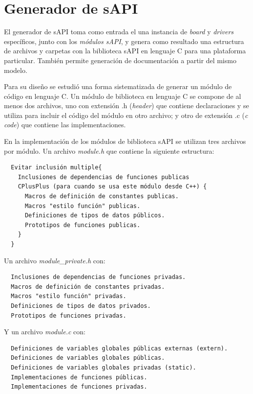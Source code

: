 \section{Generador de sAPI}
\label{sec:modelGenerator}

El generador de sAPI toma como entrada el una instancia de \emph{board} y \emph{drivers} específicos, junto con los \emph{módulos sAPI}, y genera como resultado una estructura de archivos y carpetas con la biblioteca sAPI en lenguaje C para una plataforma particular. También permite generación de documentación a partir del mismo modelo.

Para su diseño se estudió una forma sistematizada de generar un módulo de código en lenguaje C. Un módulo de biblioteca en lenguaje C se compone de al menos dos archivos, uno con extensión .h (\emph{header}) que contiene declaraciones y se utiliza para incluir el código del módulo en otro archivo; y otro de extensión .c (\emph{c code}) que contiene las implementaciones. 

En la implementación de los módulos de biblioteca sAPI se utilizan tres archivos por módulo. Un archivo \emph{module.h} que contiene la siguiente estructura:

\begin{verbatim}
  Evitar inclusión multiple{
    Inclusiones de dependencias de funciones publicas
    CPlusPlus (para cuando se usa este módulo desde C++) {
      Macros de definición de constantes publicas.
      Macros "estilo función" publicas.
      Definiciones de tipos de datos públicos.
      Prototipos de funciones publicas.
    }
  }
\end{verbatim}

Un archivo \emph{module\_private.h} con:

\begin{verbatim}
  Inclusiones de dependencias de funciones privadas.
  Macros de definición de constantes privadas.
  Macros "estilo función" privadas.
  Definiciones de tipos de datos privados.
  Prototipos de funciones privadas.
\end{verbatim}

Y un archivo \emph{module.c} con:

\begin{verbatim}
  Definiciones de variables globales públicas externas (extern).
  Definiciones de variables globales públicas.
  Definiciones de variables globales privadas (static).
  Implementaciones de funciones públicas.
  Implementaciones de funciones privadas.
\end{verbatim}

